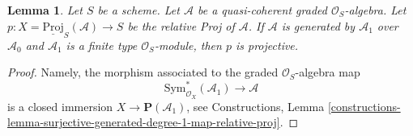\documentclass[10pt,a4paper]{amsart}
\theoremstyle{plain}
\newtheorem{lemma}[subsection]{Lemma}
\theoremstyle{definition}
\theoremstyle{remark}
\numberwithin{equation}{subsection}
\begin{document}
\begin{lemma}
\label{lemma-relative-proj-projective}
Let $S$ be a scheme. Let $\mathcal{A}$ be a quasi-coherent graded
$\mathcal{O}_S$-algebra. Let
$p : X = \underline{\text{Proj}}_S(\mathcal{A}) \to S$ be the relative
Proj of $\mathcal{A}$. If $\mathcal{A}$ is generated by
$\mathcal{A}_1$ over $\mathcal{A}_0$ and $\mathcal{A}_1$
is a finite type $\mathcal{O}_S$-module, then $p$ is projective.
\end{lemma}

\begin{proof}
Namely, the morphism associated to the graded $\mathcal{O}_S$-algebra map
$$
\text{Sym}_{\mathcal{O}_X}^*(\mathcal{A}_1)
\longrightarrow
\mathcal{A}
$$
is a closed immersion $X \to \mathbf{P}(\mathcal{A}_1)$, see
Constructions, Lemma
\ref{constructions-lemma-surjective-generated-degree-1-map-relative-proj}.
\end{proof}
\end{document}
